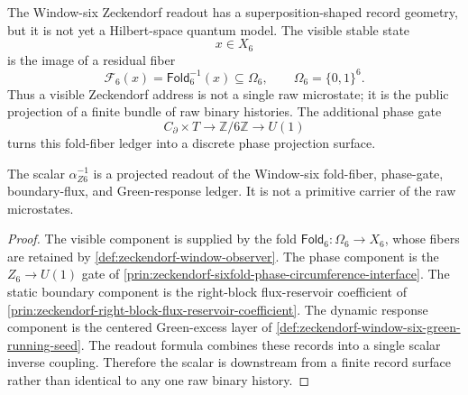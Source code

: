 \begin{principle}
\label{prin:zeckendorf-prequantum-phase-projection-reading}
The Window-six Zeckendorf readout has a superposition-shaped record
geometry, but it is not yet a Hilbert-space quantum model. The visible
stable state
$$
  x\in X_6
$$
is the image of a residual fiber
$$
  \mathcal{F}_6(x)=\mathsf{Fold}_6^{-1}(x)\subseteq\Omega_6,
  \qquad
  \Omega_6=\{0,1\}^6.
$$
Thus a visible Zeckendorf address is not a single raw microstate; it is
the public projection of a finite bundle of raw binary histories. The
additional phase gate
$$
  C_\partial\times T
  \longrightarrow
  \mathbb{Z}/6\mathbb{Z}
  \longrightarrow
  U(1)
$$
turns this fold-fiber ledger into a discrete phase projection surface.
\end{principle}

\begin{theorem}
\label{thm:zeckendorf-fine-structure-projected-phase-record}
The scalar $\alpha_{Z6}^{-1}$ is a projected readout of the Window-six
fold-fiber, phase-gate, boundary-flux, and Green-response ledger. It is
not a primitive carrier of the raw microstates.
\end{theorem}
\begin{proof}
The visible component is supplied by the fold
$\mathsf{Fold}_6:\Omega_6\to X_6$, whose fibers are retained by
\autoref{def:zeckendorf-window-observer}. The phase component is the
$Z_6\to U(1)$ gate of
\autoref{prin:zeckendorf-sixfold-phase-circumference-interface}. The
static boundary component is the right-block flux-reservoir coefficient
of \autoref{prin:zeckendorf-right-block-flux-reservoir-coefficient}.
The dynamic response component is the centered Green-excess layer of
\autoref{def:zeckendorf-window-six-green-running-seed}. The readout
formula combines these records into a single scalar inverse coupling.
Therefore the scalar is downstream from a finite record surface rather
than identical to any one raw binary history.
\end{proof}


